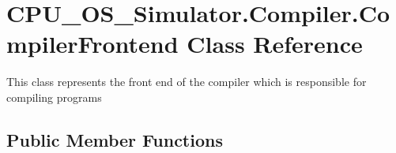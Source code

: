 \hypertarget{class_c_p_u___o_s___simulator_1_1_compiler_1_1_compiler_frontend}{}\section{C\+P\+U\+\_\+\+O\+S\+\_\+\+Simulator.\+Compiler.\+Compiler\+Frontend Class Reference}
\label{class_c_p_u___o_s___simulator_1_1_compiler_1_1_compiler_frontend}


This class represents the front end of the compiler which is responsible for compiling programs  


\subsection*{Public Member Functions}
